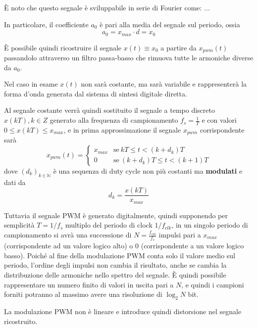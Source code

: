 È noto che questo segnale è sviluppabile in serie di Fourier come: ...

In particolare, il coefficiente $a_0$ è pari alla media del segnale sul periodo, ossia
\[
a_0 = x_{max} \cdot d = x_0
\]

È possibile quindi ricostruire il segnale $x(t)\equiv x_0$ a partire da $x_{pwm}(t)$ passandolo attraverso un filtro passa-basso che rimuova tutte le armoniche diverse da $a_0$.

Nel caso in esame $x(t)$ non sarà costante, ma sarà variabile e rappresenterà la forma d'onda generata dal sistema di sintesi digitale diretta.

Al segnale costante verrà quindi sostituito il segnale a tempo discreto $x(kT), k \in Z$ generato alla frequenza di campionamento $f_s = \frac{1}{T}$ e con valori $0 \leq x(kT) \leq x_{max}$, e in prima approssimazione il segnale $x_{pwm}$ corrispondente sarà
\[
x_{pwm}(t) = \begin{cases}
	x_{max} & \text{se}\ kT \le t < (k + d_k)T \\
	0 & \text{se}\ (k+d_k)T \le t < (k+1)T
\end{cases}
\]
dove $(d_k)_{k \in \mathbb{N}}$ è una sequenza di duty cycle non più costanti ma \textbf{modulati} e dati da
\[
d_k = \frac{x(kT)}{x_{max}}
\]

Tuttavia il segnale PWM è generato digitalmente, quindi supponendo per semplicità $T=1/f_s$ multiplo del periodo di clock $1/f_{clk}$, in un singolo periodo
di campionamento si avrà una successione di $N=\frac{f_{clk}}{f_s}$ impulsi pari a $x_{max}$ (corrispondente ad un valore logico alto) o $0$ (corrispondente a un valore logico basso).
Poiché al fine della modulazione PWM conta solo il valore medio sul periodo, l'ordine degli impulsi non cambia il risultato, anche se cambia la distribuzione delle armoniche nello spettro del segnale.
È quindi possibile rappresentare un numero finito di valori in uscita pari a $N$, e quindi i campioni forniti potranno al massimo avere una risoluzione di $\log_2{N}$ bit.

La modulazione PWM non è lineare e introduce quindi distorsione nel segnale ricostruito.
